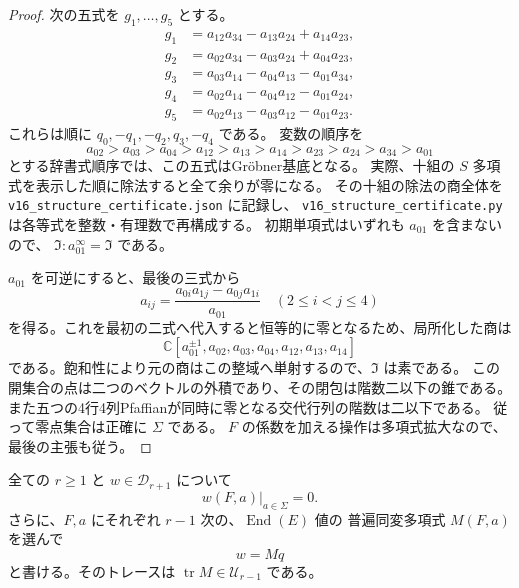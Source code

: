 \begin{proof}
次の五式を $g_1,\ldots,g_5$ とする。
\[
\begin{split}
 g_1&=a_{12}a_{34}-a_{13}a_{24}+a_{14}a_{23},\\
 g_2&=a_{02}a_{34}-a_{03}a_{24}+a_{04}a_{23},\\
 g_3&=a_{03}a_{14}-a_{04}a_{13}-a_{01}a_{34},\\
 g_4&=a_{02}a_{14}-a_{04}a_{12}-a_{01}a_{24},\\
 g_5&=a_{02}a_{13}-a_{03}a_{12}-a_{01}a_{23}.
\end{split}
\]
これらは順に $q_0,-q_1,-q_2,q_3,-q_4$ である。
変数の順序を
\[
 a_{02}>a_{03}>a_{04}>a_{12}>a_{13}>a_{14}>
 a_{23}>a_{24}>a_{34}>a_{01}
\]
とする辞書式順序では、この五式はGr\"obner基底となる。
実際、十組の $S$ 多項式を表示した順に除法すると全て余りが零になる。
その十組の除法の商全体を
\nolinkurl{v16_structure_certificate.json} に記録し、
\nolinkurl{v16_structure_certificate.py} は各等式を整数・有理数で再構成する。
初期単項式はいずれも $a_{01}$ を含まないので、
$\mathfrak I:a_{01}^{\infty}=\mathfrak I$ である。

$a_{01}$ を可逆にすると、最後の三式から
\[
 a_{ij}=\frac{a_{0i}a_{1j}-a_{0j}a_{1i}}{a_{01}}
 \quad(2\le i<j\le4)
\]
を得る。これを最初の二式へ代入すると恒等的に零となるため、局所化した商は
\[
 \mathbb C[a_{01}^{\pm1},a_{02},a_{03},a_{04},a_{12},a_{13},a_{14}]
\]
である。飽和性により元の商はこの整域へ単射するので、$\mathfrak I$ は素である。
この開集合の点は二つのベクトルの外積であり、その閉包は階数二以下の錐である。
また五つの4行4列Pfaffianが同時に零となる交代行列の階数は二以下である。
従って零点集合は正確に $\Sigma$ である。
$F$ の係数を加える操作は多項式拡大なので、最後の主張も従う。
\end{proof}

\begin{lemma}[普遍Pfaffian方向は錐上で消える]
\label{lem:v16-plucker-vanishing-D}
全ての $r\ge1$ と $w\in\mathcal D_{r+1}$ について
\[
 w(F,a)|_{a\in\Sigma}=0.
\]
さらに、$F,a$ にそれぞれ $r-1$ 次の、$\operatorname{End}(E)$ 値の
普遍同変多項式 $M(F,a)$ を選んで
\begin{equation}\label{eq:v16-equivariant-Mq}
 w=Mq
\end{equation}
と書ける。そのトレースは $\operatorname{tr}M\in\mathcal U_{r-1}$ である。
\end{lemma}

